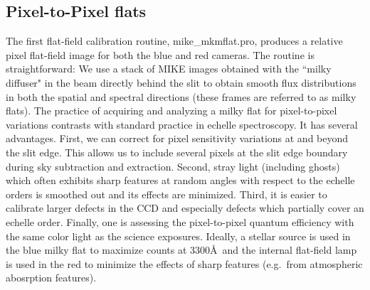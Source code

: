 \documentclass[12pt,preprint]{aastex}
\begin{document}
\subsection{Pixel-to-Pixel flats}
\label{sec:mflat}

The first flat-field calibration routine, mike\_mkmflat.pro,
produces a relative pixel flat-field image for both the blue 
and red cameras.  The routine is straightforward: We use a stack of
MIKE images obtained with the ``milky diffuser" in the beam directly behind
the slit to obtain smooth flux distributions in both the spatial and 
spectral directions (these frames are referred to as milky flats).
The practice of acquiring and analyzing a milky flat for pixel-to-pixel
variations contrasts with standard practice in echelle spectroscopy.
It has several advantages.  First, we can correct for pixel sensitivity
variations at and beyond the slit edge.  This allows us to include
several pixels at the slit edge boundary during sky subtraction
and extraction.  Second, stray light (including ghosts) which often exhibits
sharp features at random angles with respect to the echelle orders
is smoothed out and its effects are minimized.  
Third, it is easier to calibrate larger defects in the CCD and
especially defects which partially cover an echelle order.
Finally, one is assessing the pixel-to-pixel quantum efficiency with
the same color light as the science exposures.
Ideally, a stellar source is used in the blue milky flat to maximize
counts at 3300\AA\
and the internal flat-field lamp is used in the red  
to minimize the effects of sharp features (e.g.\ from atmospheric abosrption
features).
\end{document}
